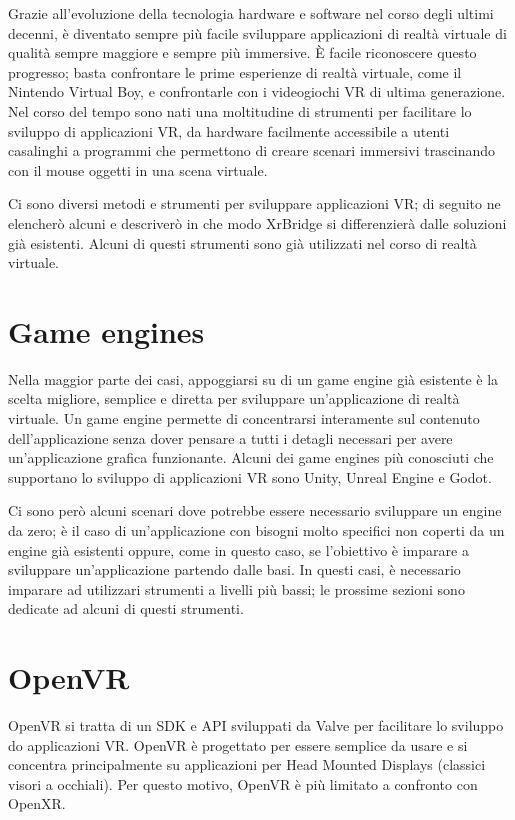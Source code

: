 \documentclass[twoside]{supsistudent}
\begin{document}
Grazie all'evoluzione della tecnologia hardware e software nel corso degli ultimi decenni, è diventato sempre più facile sviluppare applicazioni di realtà virtuale di qualità sempre maggiore e sempre più immersive. È facile riconoscere questo progresso; basta confrontare le prime esperienze di realtà virtuale, come il Nintendo Virtual Boy, e confrontarle con i videogiochi VR di ultima generazione. Nel corso del tempo sono nati una moltitudine di strumenti per facilitare lo sviluppo di applicazioni VR, da hardware facilmente accessibile a utenti casalinghi a programmi che permettono di creare scenari immersivi trascinando con il mouse oggetti in una scena virtuale.

Ci sono diversi metodi e strumenti per sviluppare applicazioni VR; di seguito ne elencherò alcuni e descriverò in che modo XrBridge si differenzierà dalle soluzioni già esistenti. Alcuni di questi strumenti sono già utilizzati nel corso di realtà virtuale.

\section{Game engines}

Nella maggior parte dei casi, appoggiarsi su di un game engine già esistente è la scelta migliore, semplice e diretta per sviluppare un'applicazione di realtà virtuale. Un game engine permette di concentrarsi interamente sul contenuto dell'applicazione senza dover pensare a tutti i detagli necessari per avere un'applicazione grafica funzionante. Alcuni dei game engines più conosciuti che supportano lo sviluppo di applicazioni VR sono Unity, Unreal Engine e Godot.

Ci sono però alcuni scenari dove potrebbe essere necessario sviluppare un engine da zero; è il caso di un'applicazione con bisogni molto specifici non coperti da un engine già esistenti oppure, come in questo caso, se l'obiettivo è imparare a sviluppare un'applicazione partendo dalle basi. In questi casi, è necessario imparare ad utilizzari strumenti a livelli più bassi; le prossime sezioni sono dedicate ad alcuni di questi strumenti.

\section{OpenVR}

OpenVR si tratta di un SDK e API sviluppati da Valve per facilitare lo sviluppo do applicazioni VR. OpenVR è progettato per essere semplice da usare e si concentra principalmente su applicazioni per Head Mounted Displays (classici visori a occhiali). Per questo motivo, OpenVR è più limitato a confronto con OpenXR.
\end{document}
